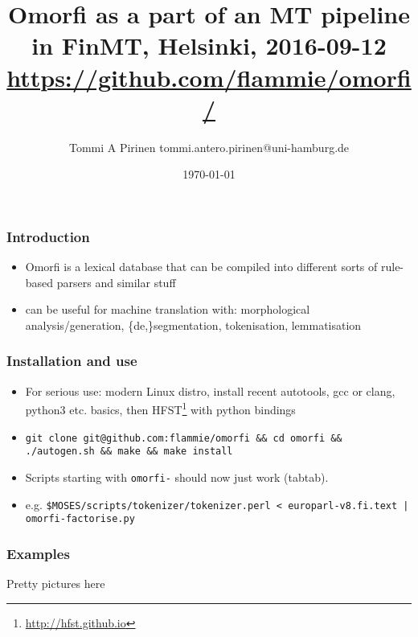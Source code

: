 \documentclass{beamer}
\title{Omorfi as a part of an MT pipeline
\scriptsize{in FinMT, Helsinki, 2016-09-12\\
\url{https://github.com/flammie/omorfi/}}}
\author{Tommi A Pirinen \scriptsize \guilsinglleft tommi.antero.pirinen@uni-hamburg.de \guilsinglright }
\institute{HZSK.de, CLARIN.de, etc.}
\date{\today}
\begin{document}

\maketitle

\begin{frame}
    \frametitle{Introduction}
    \begin{itemize}
        \item Omorfi is a lexical database that can be compiled into different
            sorts of rule-based parsers and similar stuff
        \item can be useful for machine translation with: morphological
            analysis/generation, \{de,\}segmentation, tokenisation,
            lemmatisation
    \end{itemize}
\end{frame}


\begin{frame}
    \frametitle{Installation and use}
    \begin{itemize}
        \item For serious use: modern Linux distro, install recent autotools,
            gcc or clang, python3 etc. basics, then
            HFST\footnote{\url{http://hfst.github.io}} with python bindings
        \item \texttt{git clone git@github.com:flammie/omorfi \&\& cd omorfi
            \&\& ./autogen.sh \&\& make \&\& make install}
        \item Scripts starting with \texttt{omorfi-} should now just work
            (tabtab).
        \item e.g. \texttt{\$MOSES/scripts/tokenizer/tokenizer.perl <
            europarl-v8.fi.text | omorfi-factorise.py}
    \end{itemize}
\end{frame}

\begin{frame}
    \frametitle{Examples}
    Pretty pictures here
\end{frame}
\end{document}
